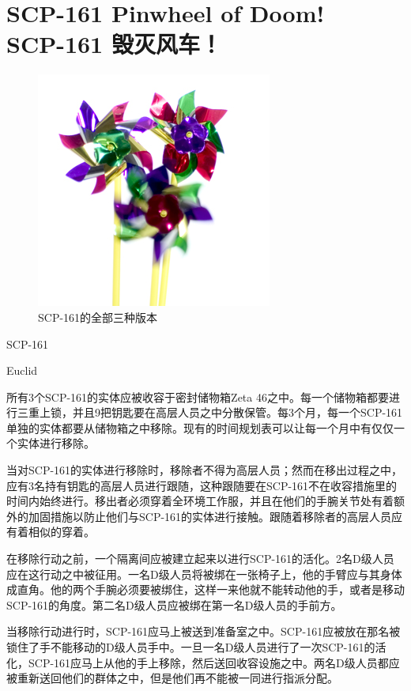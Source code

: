 \chapter[SCP-161 毁灭风车！]{
    SCP-161 Pinwheel of Doom!\\
    SCP-161 毁灭风车！
}

\label{chap:SCP-161}

\begin{figure}[H]
    \centering
    \includegraphics[width=0.5\linewidth]{images/SCP-161.jpg}
    \caption*{SCP-161的全部三种版本}
\end{figure}

SCP-161

Euclid

所有3个SCP-161的实体应被收容于密封储物箱Zeta 46之中。每一个储物箱都要进行三重上锁，并且9把钥匙要在高层人员之中分散保管。每3个月，每一个SCP-161单独的实体都要从储物箱之中移除。现有的时间规划表可以让每一个月中有仅仅一个实体进行移除。

当对SCP-161的实体进行移除时，移除者不得为高层人员；然而在移出过程之中，应有3名持有钥匙的高层人员进行跟随，这种跟随要在SCP-161不在收容措施里的时间内始终进行。移出者必须穿着全环境工作服，并且在他们的手腕关节处有着额外的加固措施以防止他们与SCP-161的实体进行接触。跟随着移除者的高层人员应有着相似的穿着。

在移除行动之前，一个隔离间应被建立起来以进行SCP-161的活化。2名D级人员应在这行动之中被征用。一名D级人员将被绑在一张椅子上，他的手臂应与其身体成直角。他的两个手腕必须要被绑住，这样一来他就不能转动他的手，或者是移动SCP-161的角度。第二名D级人员应被绑在第一名D级人员的手前方。

当移除行动进行时，SCP-161应马上被送到准备室之中。SCP-161应被放在那名被锁住了手不能移动的D级人员手中。一旦一名D级人员进行了一次SCP-161的活化，SCP-161应马上从他的手上移除，然后送回收容设施之中。两名D级人员都应被重新送回他们的群体之中，但是他们再不能被一同进行指派分配。

